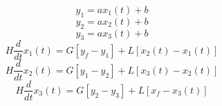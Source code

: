 \begin{equation*}
  y_1 = a x_1(t) + b
\end{equation*}
\begin{equation*}
  y_2 = a x_2(t) + b
\end{equation*}
\begin{equation}
  y_3 = a x_3(t) + b
  \label{eq:three_absorber01_2}
\end{equation}
\begin{equation*}
  H \frac{d}{dt}x_1(t) = G [y_f - y_1] + L [x_2(t) - x_1(t)]
\end{equation*}
\begin{equation*}
  H \frac{d}{dt}x_2(t) = G [y_1 - y_2] + L [x_3(t) - x_2(t)]
\end{equation*}
\begin{equation*}
  H \frac{d}{dt}x_3(t) = G [y_2 - y_3] + L [x_f - x_3(t)]
\end{equation*}